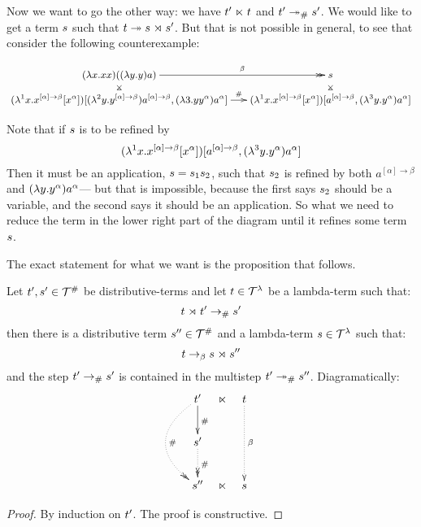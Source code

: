 \bigskip

Now we want to go the other way: we have $t' \mathrel{\ltimes} t$ and $t' \mathrel{\mathrel{\twoheadrightarrow}_{\mathtt{\#}}} s'$.
We would like to get a term $s$ such that $t \mathrel{\twoheadrightarrow} s \mathrel{\rtimes} s'$.
But that is not possible in general, to see that consider the following counterexample:

\[
  {\small
    \xymatrix@R=.25cm@C=.5cm{
      (\lam{\var}{\var \var}) ((\lam{\vartwo}{\vartwo}) a)
      \ar@{->>}[r]^-{\beta}
      \ar@{}[d]|*=0[@]{\rtimes}
      &
      \tmtwo
      \ar@{}[d]|*=0[@]{\rtimes}
    \\
      (\lamp{1}{\var}{\var^{[\alpha] \to \beta} [\var^{\alpha}]})
          [(\lamp{2}{\vartwo}{\vartwo^{[\alpha] \to \beta}}) a^{[\alpha] \to \beta},
           (\lam{3}{\vartwo}{\vartwo^\alpha}) a^\alpha]
      \ar@{->}[r]^-{\dist}
      &
      (\lamp{1}{\var}{\var^{[\alpha] \to \beta} [\var^{\alpha}]})
          [a^{[\alpha] \to \beta},
           (\lamp{3}{\vartwo}{\vartwo^\alpha}) a^\alpha]
    }
  }
\]

Note that if $s$ is to be refined by
  \[(\lambda^{1} x. x^{[\alpha] \to \beta} [x^{\alpha}])
          [a^{[\alpha] \to \beta},
           (\lambda^{3} y. y^\alpha) a^\alpha]\]
Then it must be an application, $s = s_1 s_2$, such that $s_2$
is refined by both $a^{[\alpha] \to \beta}$ and $(\lambda y. y^\alpha) a^\alpha$---
but that is impossible, because the first says $s_2$ should be a variable, and the second
says it should be an application.
So what we need to reduce the term in the lower right part of the diagram until
it refines some term $s$.

The exact statement for what we want is the proposition that follows.

\begin{proposition}
Let $t',s' \in \mathcal{T}^{\mathtt{\#}}$ be distributive-terms and let $t \in \mathcal{T}^{\lambda}$ be a lambda-term such that:
\[
  t \mathrel{\rtimes} t' \mathrel{\to_{\mathtt{\#}}} s'
\]
then there is a distributive term $s'' \in \mathcal{T}^{\mathtt{\#}}$ and a lambda-term $s \in \mathcal{T}^{\lambda}$ such that:
\[
  t \mathrel{\to_\beta} s \mathrel{\rtimes} s''
\]
and the step $t' \mathrel{\to_{\mathtt{\#}}} s'$ is contained in the multistep $t' \mathrel{\mathrel{\twoheadrightarrow}_{\mathtt{\#}}} s''$.
Diagramatically:
\[
\xymatrix@C=.25cm{
\tm' \ar[d]^{\dist} \ar@{.>>}@/_1cm/[dd]^{\dist} & \refines  & \tm    \ar@{.>}[dd]^{\beta} \\
\tmtwo' \ar@{.>>}[d]^{\dist}                     &            &                             \\
\tmtwo''                                         & \refines  & \tmtwo                      \\
}
\]
\end{proposition}
\begin{proof}
 By induction on $t'$. The proof is constructive.
\end{proof}

